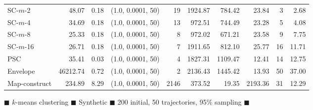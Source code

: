 \begin{figure}
\begin{center}
\begin{minipage}{\textwidth}
{\begin{tabular}{@{}lrrcrrrrrr@{}}
        SC-$m$-2 & 48.07 & 0.18 & (1.0, 0.0001, 50) & 19 & 1924.87 & 784.42 & 23.84 & 3 & 2.68\\
        SC-$m$-4 & 34.69 & 0.18 & (1.0, 0.0001, 50) & 13 & 972.51 & 744.49 & 23.28 & 5 & 4.08\\
        SC-$m$-8 & 25.33 & 0.18 & (1.0, 0.0001, 50) & 8 & 972.02 & 671.21 & 23.58 & 9 & 7.75\\
        SC-$m$-16 & 26.71 & 0.18 & (1.0, 0.0001, 50) & 7 & 1911.65 & 812.10 & 25.77 & 16 & 11.71\\
        PSC & 35.41 & 0.03 & (1.0, 0.0001, 50) & 4 & 1827.31 & 1109.47 & 12.41 & 14 & 12.75\\
        Envelope & 46212.74 & 0.72 & (1.0, 0.0001, 50) & 2 & 2136.43 & 1445.42 & 13.93 & 50 & 37.00\\
        Map-construct & 234.89 & 8.29 & (1.0, 0.0001, 50) & 2146 & 373.52 & 19.35 & 2193.36 & 31 & 12.29\\
        \bottomrule
    \end{tabular}
    }
    \end{minipage}

        \caption{$\blacksquare$ $k$-means clustering $\blacksquare$ Synthetic $\blacksquare$ 200 initial, 50 trajectories, 95\% sampling $\blacksquare$}

    \end{center} \end{figure}